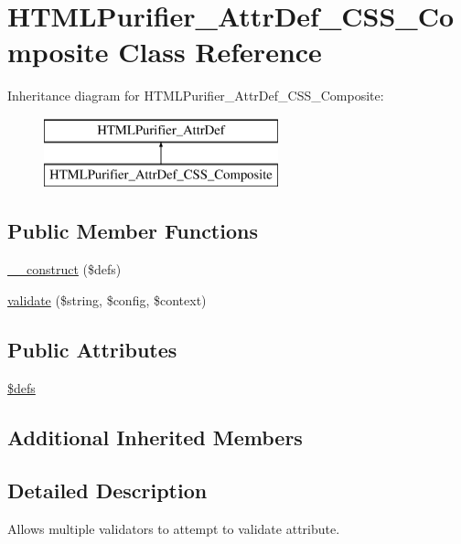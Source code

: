 \hypertarget{classHTMLPurifier__AttrDef__CSS__Composite}{\section{H\+T\+M\+L\+Purifier\+\_\+\+Attr\+Def\+\_\+\+C\+S\+S\+\_\+\+Composite Class Reference}
\label{classHTMLPurifier__AttrDef__CSS__Composite}
}
Inheritance diagram for H\+T\+M\+L\+Purifier\+\_\+\+Attr\+Def\+\_\+\+C\+S\+S\+\_\+\+Composite\+:\begin{figure}[H]
\begin{center}
\leavevmode
\includegraphics[height=2.000000cm]{classHTMLPurifier__AttrDef__CSS__Composite}
\end{center}
\end{figure}
\subsection*{Public Member Functions}
\begin{DoxyCompactItemize}
\item 
\hyperlink{classHTMLPurifier__AttrDef__CSS__Composite_afe93a1159bad0049329c36fba090e71c}{\+\_\+\+\_\+construct} (\$defs)
\item 
\hyperlink{classHTMLPurifier__AttrDef__CSS__Composite_a4f145b8a5c7a853ea01927714708ab40}{validate} (\$string, \$config, \$context)
\end{DoxyCompactItemize}
\subsection*{Public Attributes}
\begin{DoxyCompactItemize}
\item 
\hyperlink{classHTMLPurifier__AttrDef__CSS__Composite_a7e99e8d8ab6507cf5e6cb4b1cc8935fc}{\$defs}
\end{DoxyCompactItemize}
\subsection*{Additional Inherited Members}


\subsection{Detailed Description}
Allows multiple validators to attempt to validate attribute.

